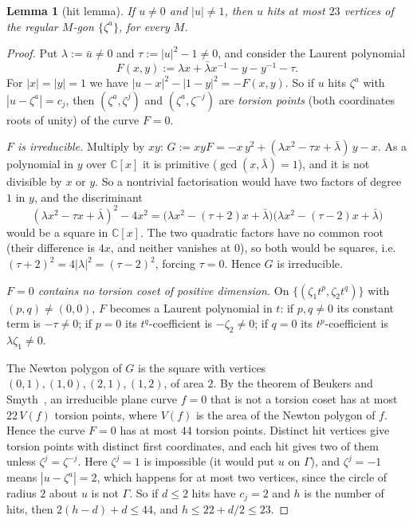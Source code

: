 \documentclass[11pt]{amsart}
\newtheorem{lemma}[theorem]{Lemma}
\theoremstyle{definition}
\theoremstyle{remark}
\begin{document}
\begin{lemma}[hit lemma]\label{lem:hit}
If $u\ne0$ and $|u|\ne1$, then $u$ hits at most $23$ vertices of the regular $M$-gon $\{\zeta^a\}$, for every $M$.
\end{lemma}
\begin{proof}
Put $\lambda:=\bar u\ne0$ and $\tau:=|u|^2-1\ne0$, and consider the Laurent polynomial
\[
F(x,y):=\lambda x+\bar\lambda x^{-1}-y-y^{-1}-\tau .
\]
For $|x|=|y|=1$ we have $|u-x|^2-|1-y|^2=-F(x,y)$. So if $u$ hits $\zeta^a$ with $|u-\zeta^a|=c_j$, then $(\zeta^a,\zeta^{j})$ and $(\zeta^a,\zeta^{-j})$ are \emph{torsion points} (both coordinates roots of unity) of the curve $F=0$.

\emph{$F$ is irreducible.} Multiply by $xy$: $G:=xyF=-x\,y^2+(\lambda x^2-\tau x+\bar\lambda)\,y-x$. As a polynomial in $y$ over $\mathbb C[x]$ it is primitive ($\gcd(x,\bar\lambda)=1$), and it is not divisible by $x$ or $y$. So a nontrivial factorisation would have two factors of degree $1$ in $y$, and the discriminant
\[
(\lambda x^2-\tau x+\bar\lambda)^2-4x^2=\bigl(\lambda x^2-(\tau+2)x+\bar\lambda\bigr)\bigl(\lambda x^2-(\tau-2)x+\bar\lambda\bigr)
\]
would be a square in $\mathbb C[x]$. The two quadratic factors have no common root (their difference is $4x$, and neither vanishes at $0$), so both would be squares, i.e.\ $(\tau+2)^2=4|\lambda|^2=(\tau-2)^2$, forcing $\tau=0$. Hence $G$ is irreducible.

\emph{$F=0$ contains no torsion coset of positive dimension.} On $\{(\zeta_1t^p,\zeta_2t^q)\}$ with $(p,q)\ne(0,0)$, $F$ becomes a Laurent polynomial in $t$: if $p,q\ne0$ its constant term is $-\tau\ne0$; if $p=0$ its $t^q$-coefficient is $-\zeta_2\ne0$; if $q=0$ its $t^p$-coefficient is $\lambda\zeta_1\ne0$.

The Newton polygon of $G$ is the square with vertices $(0,1),(1,0),(2,1),(1,2)$, of area $2$. By the theorem of Beukers and Smyth~\cite{BS02}, an irreducible plane curve $f=0$ that is not a torsion coset has at most $22\,V(f)$ torsion points, where $V(f)$ is the area of the Newton polygon of $f$. Hence the curve $F=0$ has at most $44$ torsion points. Distinct hit vertices give torsion points with distinct first coordinates, and each hit gives two of them unless $\zeta^j=\zeta^{-j}$. Here $\zeta^j=1$ is impossible (it would put $u$ on $\Gamma$), and $\zeta^j=-1$ means $|u-\zeta^a|=2$, which happens for at most two vertices, since the circle of radius $2$ about $u$ is not $\Gamma$. So if $d\le2$ hits have $c_j=2$ and $h$ is the number of hits, then $2(h-d)+d\le44$, and $h\le22+d/2\le23$.
\end{proof}
\end{document}
